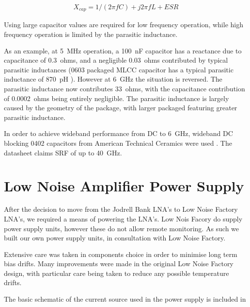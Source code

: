  \begin{eqnarray}
  X_{cap}=1/(2 \pi fC) + j 2 \pi fL + ESR
 \label{eq:capacitorReactance}
 \end{eqnarray}

Using  large capacitor values are required for low frequency operation, while high frequency operation is limited by the parasitic inductance. 

As an example, at 5~MHz operation, a 100~nF capacitor has a reactance due to capacitance of 0.3~ohms, and a negligible 0.03~ohms contributed by typical parasitic inductances (0603 packaged MLCC capacitor has a typical parasitic inductance of 870~pH \cite{Cain2010}). However at 6~GHz the situation is reversed. The parasitic inductance now contributes 33~ohms, with the capacitance contribution of 0.0002~ohms being entirely negligible. The parasitic inductance is largely caused by the geometry of the package, with larger packaged featuring greater parasitic inductance. 

In order to achieve wideband performance from DC to 6~GHz, wideband DC blocking 0402 capacitors from American Technical Ceramics were used \cite{atc550L104}. The datasheet claims SRF of up to 40~GHz.

  
\section{Low Noise Amplifier Power Supply}

After the decision to move from the Jodrell Bank LNA's to Low Noise Factory LNA's, we required a means of powering the LNA's. Low Nois Facory do supply power supply units, however these do not allow remote monitoring. As such we built our own power supply units, in consultation with Low Noise Factory.

Extensive care was taken in components choice in order to minimise long term bias drifts. Many improvements were made in the original Low Noise Factory design, with particular care being taken to reduce any possible temperature drifts.

The basic schematic of the current source used in the power supply is included in 


